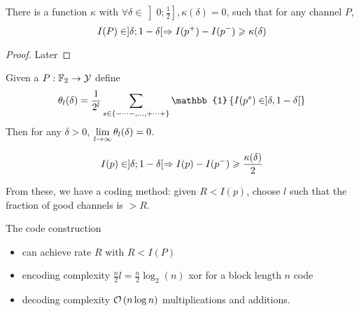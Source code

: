 \begin{theorem}
    There is a function $\kappa$ with $\forall \delta \in \left] 0;\frac{1}{2} \right], \kappa(\delta) = 0$, such that for any channel $P$,
    \[
        I(P) \in ]\delta;1-\delta[ \Rightarrow I(p^+) - I(p^-) \geqslant \kappa(\delta)
    \]
\end{theorem}
\begin{proof}
    Later
\end{proof}

\begin{theorem}
    Given a $P : \mathbb{F}_2 \rightarrow \mathcal{Y}$ define
    \[
        \theta_l(\delta) = \frac{1}{2^l} \suml_{s\in\set{-\cdots-,\ldots,+\cdots+}} \mathbb{1}\set{I(p^s)\in]\delta, 1-\delta[}
    \]
    Then for any $\delta > 0$, $\lim\limits_{l\to\infty} \theta_l(\delta) = 0$.
\end{theorem}

\begin{theorem}
    \[
        I(p) \in ]\delta;1-\delta[ \Rightarrow I(p)-I(p^-) \geqslant \frac{\kappa(\delta)}{2}
    \]
\end{theorem}

From these, we have a coding method: given $R < I(p)$, choose $l$ such that the fraction of good channels is $>R$.

The code construction
\begin{itemize}
    \item can achieve rate $R$ with $R<I(P)$
    \item encoding complexity $\frac{n}{2}l = \frac{n}{2}\log_2(n)$ xor for a block length $n$ code
    \item decoding complexity $\mathcal O \left( n\log n \right)$ multiplications and additions.
\end{itemize}


